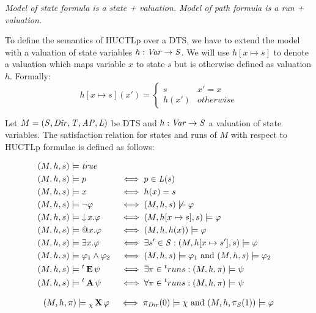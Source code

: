 \emph{Model of state formula is a state + valuation. Model of path formula is a run + valuation.}

To define the semantics of \ac{HUCTLp} over a \ac{DTS}, we have to extend the model with a valuation of state variables $h : \mathit{Var} \to \mathit{S}$. We will use $h[x \mapsto s]$ to denote a valuation which maps variable $x$ to state $s$ but is otherwise defined as valuation $h$. Formally:
\[
	h[x \mapsto s](x') = \begin{cases}
		s & x' = x \\
		h(x') & otherwise
	\end{cases}
\]

Let $M = (\mathit{S}, \mathit{Dir}, \mathit{T}, \mathit{AP}, \mathit{L})$ be \ac{DTS} and $h : \mathit{Var} \to \mathit{S}$ a valuation of state variables. The satisfaction relation for states and runs of $M$ with respect to \ac{HUCTLp} formulae is defined as follows:

\begin{alignat*}{2}
	(M,h,s) &\models \mathit{true}	\\
	(M,h,s) &\models p											   && \iff p \in \mathit{L}(s) \\
	(M,h,s) &\models x											   && \iff h(x) = s \\
	(M,h,s) &\models \neg \varphi  							  && \iff (M, h,s) \not\models \varphi \\
	(M,h,s) &\models \operatorname{\downarrow} x. \varphi 				   && \iff (M,h[x \mapsto s], s) \models \varphi \\
	(M,h,s) &\models \operatorname{@\!} x. \varphi 					&& \iff (M,h,h(x)) \models \varphi \\
	(M,h,s) &\models \exists x. \varphi 			  && \iff \exists s' \in \mathit{S} :  (M,h[x \mapsto s'], s) \models \varphi \\	
	(M,h,s) &\models \varphi_1 \land \varphi_2 			&& \iff (M,h,s) \models \varphi_1 \text{ and } (M,h,s) \models \varphi_2  \\
	(M,h,s) &\models {}^t\operatorname{\mathbf{E}} \psi 				  && \iff \exists \pi \in {}^truns : (M,h,\pi) \models \psi \\
	(M,h,s) &\models {}^t\operatorname{\mathbf{A}} \psi 				  && \iff \forall \pi \in {}^truns : (M,h,\pi) \models \psi \\	
\end{alignat*}

\begin{alignat*}{2}
	(M,h,\pi) &\models {}_{\chi}\operatorname{\mathbf{X}} \varphi				   && \iff \pi_{\mathit{Dir}}(0) \models \chi \text{ and } (M, h, \pi_{\mathit{S}}(1)) \models \varphi \\
\end{alignat*}
